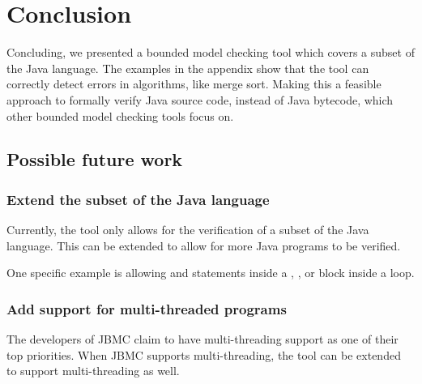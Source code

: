 \chapter{Conclusion} \label{chap:conclusion}
Concluding, we presented a bounded model checking tool which covers a subset of
the Java language. The examples in the appendix show that the tool can correctly 
detect errors in algorithms, like merge sort. Making this a feasible approach to
formally verify Java source code, instead of Java bytecode, which other bounded
model checking tools focus on.

\section{Possible future work}
\subsection*{Extend the subset of the Java language}
Currently, the tool only allows for the verification of a subset of the Java
language. This can be extended to allow for more Java programs to be verified.

One specific example is allowing  and 
statements inside a , , or 
block inside a loop.

\subsection*{Add support for multi-threaded programs}
The developers of JBMC claim to have multi-threading support as one of their top
priorities. When JBMC supports multi-threading, the tool can be extended to support
multi-threading as well.